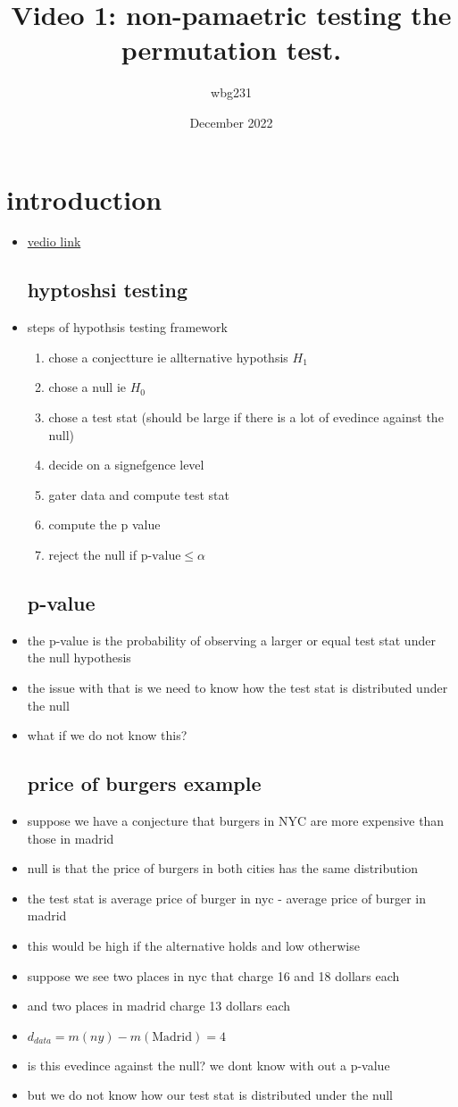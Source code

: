 \documentclass{article}
\title{Video 1: non-pamaetric testing the permutation test. }
\author{wbg231 }
\date{December 2022}
\begin{document}
\maketitle

\section{introduction}
\begin{itemize}
\item \href{https://www.youtube.com/watch?v=frSkAi36qd0}{vedio link}
\subsection{hyptoshsi testing }
\item steps of hypothsis testing framework 
\begin{enumerate}
    \item chose a conjectture ie allternative hypothsis $H_{1}$
    \item chose a null ie $H_{0}$
    \item chose a test stat (should be large if there is a lot of evedince against the null) 
    \item decide on a signefgence level
    \item gater data and compute test stat 
    \item compute the p value 
    \item reject the null if $\text{p-value}\leq \alpha$

\end{enumerate}
\subsection{p-value}
\item the p-value is the probability of observing a larger or equal test stat under the null hypothesis
\item the issue with that is we need to know how the test stat is distributed under the null 
\item what if we do not know this?
\subsection{price of burgers example}
\item suppose we have a conjecture that burgers in NYC are more expensive  than those in madrid 
\item null is that the price of burgers in both cities has the same distribution 
\item the test stat is average price of burger in nyc - average price of burger in madrid 
\item this would be high if the alternative holds and low otherwise
\item suppose we see two places in nyc that charge 16 and 18 dollars each 
\item and two places in madrid charge 13 dollars each 
\item $d_{data}=m(ny)-m(\text{Madrid})=4$
\item is this evedince against the null? we dont know with out a p-value 
\item but we do not know how our test stat is distributed under the null

\end{itemize}
\end{document}
